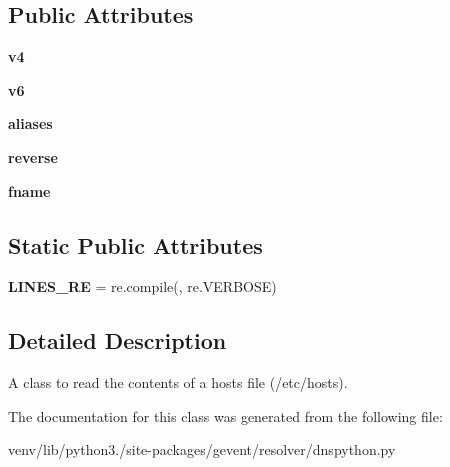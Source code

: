 \subsection*{Public Attributes}
\begin{DoxyCompactItemize}
\item 
\mbox{\label{classgevent_1_1resolver_1_1dnspython_1_1_hosts_file_a804c789a36d876cd64fe0b05d8136e71}} 
{\bfseries v4}
\item 
\mbox{\label{classgevent_1_1resolver_1_1dnspython_1_1_hosts_file_a7912b77fffb781c2c6ef805436b7a4ce}} 
{\bfseries v6}
\item 
\mbox{\label{classgevent_1_1resolver_1_1dnspython_1_1_hosts_file_a67d75478077e0b1e4d808bbf0569c94e}} 
{\bfseries aliases}
\item 
\mbox{\label{classgevent_1_1resolver_1_1dnspython_1_1_hosts_file_a80e52bfd741d3f550f3295b380f49b05}} 
{\bfseries reverse}
\item 
\mbox{\label{classgevent_1_1resolver_1_1dnspython_1_1_hosts_file_a2d2a029247e8391219f952d6c0c18fcb}} 
{\bfseries fname}
\end{DoxyCompactItemize}
\subsection*{Static Public Attributes}
\begin{DoxyCompactItemize}
\item 
\mbox{\label{classgevent_1_1resolver_1_1dnspython_1_1_hosts_file_abb69dc42122a98e8b78f8f517404f3a4}} 
{\bfseries L\+I\+N\+E\+S\+\_\+\+RE} = re.\+compile(, re.\+V\+E\+R\+B\+O\+SE)
\end{DoxyCompactItemize}


\subsection{Detailed Description}
\begin{DoxyVerb}A class to read the contents of a hosts file (/etc/hosts).
\end{DoxyVerb}
 

The documentation for this class was generated from the following file\+:\begin{DoxyCompactItemize}
\item 
venv/lib/python3./site-\/packages/gevent/resolver/dnspython.\+py\end{DoxyCompactItemize}
